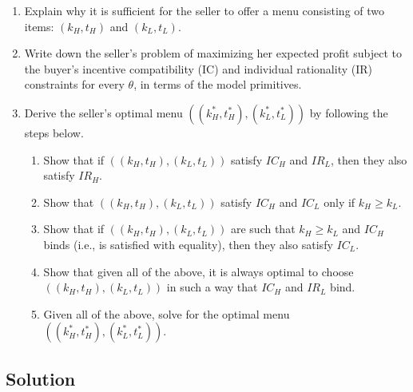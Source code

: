 \documentclass[a4paper]{article}
\newif\ifsolutions
\begin{document}
\begin{enumerate}
	\item Explain why it is sufficient for the seller to offer a menu consisting of two items: $(k_H,t_H)$ and $(k_L,t_L)$.
	
	\item Write down the seller's problem of maximizing her expected profit subject to the buyer's incentive compatibility (IC) and individual rationality (IR) constraints for every $\theta$, in terms of the model primitives.
	
	\item Derive the seller's optimal menu $((k_H^*,t_H^*), (k_L^*,t_L^*))$ by following the steps below.
	\begin{enumerate}
		\item Show that if $((k_H,t_H),(k_L,t_L))$ satisfy $IC_H$ and $IR_L$, then they also satisfy $IR_H$.
		\item Show that $((k_H,t_H),(k_L,t_L))$ satisfy $IC_H$ and $IC_L$ only if $k_H \geq k_L$.
		\item Show that if $((k_H,t_H),(k_L,t_L))$ are such that $k_H \geq k_L$ and $IC_H$ binds (i.e., is satisfied with equality), then they also satisfy $IC_L$.
		\item Show that given all of the above, it is always optimal to choose  $((k_H,t_H),(k_L,t_L))$ in such a way that $IC_H$ and $IR_L$ bind.
		\item Given all of the above, solve for the optimal menu $((k_H^*,t_H^*), (k_L^*,t_L^*))$.
	\end{enumerate}
\end{enumerate}

\ifsolutions
\subsection*{Solution}
\end{document}
